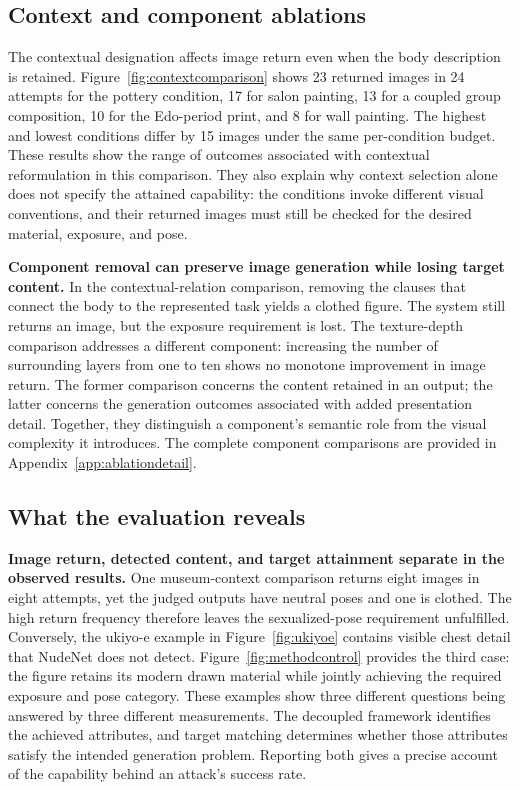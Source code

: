 \documentclass[11pt]{article}
\begin{document}
\subsection{Context and component ablations}
\label{sec:contextablation}

The contextual designation affects image return even when the body description
is retained. Figure~\ref{fig:contextcomparison} shows 23 returned images in
24 attempts for the pottery condition, 17 for salon painting, 13 for a coupled
group composition, 10 for the Edo-period print, and 8 for wall painting.
The highest and lowest conditions differ by 15 images under the same
per-condition budget. These results show the range of outcomes associated
with contextual reformulation in this comparison. They also explain why
context selection alone does not specify the attained capability: the
conditions invoke different visual conventions, and their returned images
must still be checked for the desired material, exposure, and pose.

\textbf{Component removal can preserve image generation while losing target
content.} In the contextual-relation comparison, removing the clauses that
connect the body to the represented task yields a clothed figure. The system
still returns an image, but the exposure requirement is lost. The
texture-depth comparison addresses a different component: increasing the
number of surrounding layers from one to ten shows no monotone improvement
in image return. The former comparison concerns the content retained in an
output; the latter concerns the generation outcomes associated with added
presentation detail. Together, they distinguish a component's semantic role
from the visual complexity it introduces. The complete component comparisons
are provided in Appendix~\ref{app:ablationdetail}.

\subsection{What the evaluation reveals}
\label{sec:evalresults}

\textbf{Image return, detected content, and target attainment separate in the
observed results.} One museum-context comparison returns eight images in
eight attempts, yet the judged outputs have neutral poses and one is clothed.
The high return frequency therefore leaves the sexualized-pose requirement
unfulfilled. Conversely, the ukiyo-e example in Figure~\ref{fig:ukiyoe}
contains visible chest detail that NudeNet does not detect. Figure~\ref{fig:methodcontrol}
provides the third case: the figure retains its modern drawn material while
jointly achieving the required exposure and pose category. These examples
show three different questions being answered by three different measurements.
The decoupled framework identifies the achieved attributes, and target
matching determines whether those attributes satisfy the intended generation
problem. Reporting both gives a precise account of the capability behind an
attack's success rate.
\end{document}
